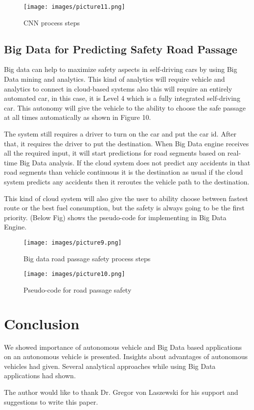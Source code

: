 \documentclass[sigconf]{acmart}
\begin{document}
\begin{figure}[!ht]
  \centering
      \texttt{[image: images/picture11.png]}
  \caption{CNN process steps}\label{F:nvidiaCNNmodel}
\end{figure}

\subsection{Big Data for Predicting Safety Road Passage}
Big data can help to maximize safety aspects in self-driving cars by using Big Data mining and analytics. This kind of analytics will require vehicle and analytics to connect in cloud-based systems also this will require an entirely automated car, in this case, it is Level 4 which is a fully integrated self-driving car. This autonomy will give the vehicle to the ability to choose the safe passage at all times automatically as shown in Figure 10\cite{hamzah}.
\par The system still requires a driver to turn on the car and put the car id. After that, it requires the driver to put the destination. When Big Data engine receives all the required input, it will start predictions for road segments based on real-time Big Data analysis. If the cloud system does not predict any accidents in that road segments than vehicle continuous it is the destination as usual if the cloud system predicts any accidents then it reroutes the vehicle path to the destination\cite{hamzah}.
\par This kind of cloud system will also give the user to ability choose between fastest route or the best fuel consumption, but the safety is always going to be the first priority. (Below Fig) shows the pseudo-code for implementing in Big Data Engine.
\begin{figure}[!ht]
  \centering
      \texttt{[image: images/picture9.png]}
  \caption{Big data road passage safety process steps}\label{F:architecture}
\end{figure}

\begin{figure}[!ht]
  \centering
      \texttt{[image: images/picture10.png]}
  \caption{Pseudo-code for road passage safety}\label{F:pseudo-code}
\end{figure}

\section{Conclusion}
    We showed importance of autonomous vehicle and Big Data based applications on an autonomous vehicle is presented. Insights about advantages of autonomous vehicles had given. Several analytical approaches while using Big Data applications had shown.

\begin{acks}

The author would like to thank Dr. Gregor von Laszewski for his support and suggestions to write this paper.

\end{acks}


 
\end{document}
